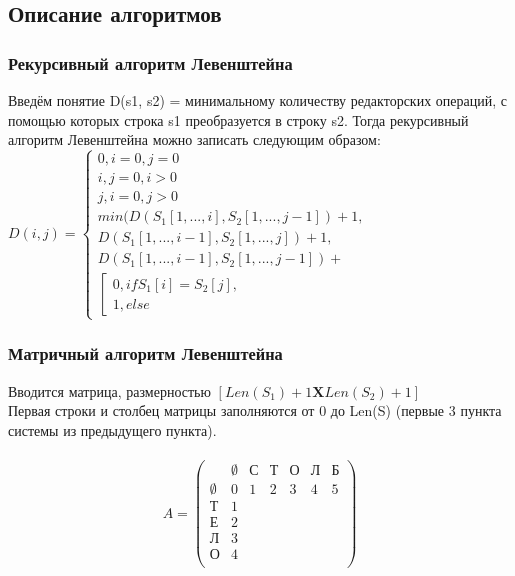 \documentclass[12pt,a4paper]{article}
\begin{document}
\subsection{Описание алгоритмов}

\subsubsection{Рекурсивный алгоритм Левенштейна}
Введём понятие D(s1, s2) = минимальному количеству редакторских операций, с помощью которых строка s1 преобразуется в строку s2.
Тогда рекурсивный алгоритм Левенштейна можно записать следующим образом:\\
$
D(i, j) = \begin{cases}
	0, i = 0, j = 0 \\
	i, j = 0, i > 0 \\
	j, i = 0, j > 0 \\
	min(D(S_{1}[1, ..., i], S_{2}[1, ..., j - 1]) + 1,\\
	D(S_{1}[1, ..., i - 1], S_{2}[1, ..., j]) + 1,\\
	D(S_{1}[1, ..., i - 1], S_{2}[1, ..., j - 1]) + \\
	\left[
	\begin{gathered}
	0, if S_{1}[i] = S_{2}[j],\\
	1, else
	\end{gathered}
	\right.
\end{cases}
$

\subsubsection{Матричный алгоритм Левенштейна}
Вводится матрица, размерностью $[Len(S_{1}) + 1 \textbf{X} Len(S_{2}) + 1]$\\
Первая строки и столбец матрицы заполняются от 0 до Len(S) (первые 3 пункта системы из предыдущего пункта).\\
\\
\begin{equation*}
A = \left(
\begin{array}{ccccccc}
 & \emptyset & \text{С} & \text{Т} & \text{О} & \text{Л} & \text{Б}\\
\emptyset & 0 & 1 & 2 & 3 & 4 & 5\\
\text{Т} & 1 & & & & & \\ 
\text{Е} & 2 & & & & & \\
\text{Л} & 3 & & & & & \\
\text{О} & 4 & & & & & \\
\end{array}
\right)
\end{equation*}
\end{document}
